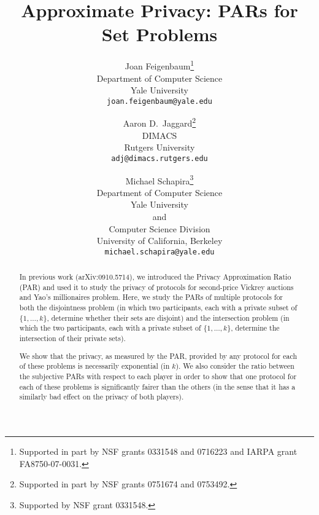 \documentclass{article}
\theoremstyle{theorem}
\theoremstyle{definition}
\theoremstyle{remark}
\begin{document}
\title{Approximate Privacy: PARs for Set Problems}

\author{Joan Feigenbaum\thanks{Supported in part by NSF grants
0331548 and 0716223 and IARPA grant FA8750-07-0031.}\\
Department of Computer Science\\
Yale University\\
\texttt{joan.feigenbaum@yale.edu}
\and
Aaron D.\ Jaggard\thanks{Supported in part by
NSF grants 0751674 and 0753492.}\\
DIMACS\\
Rutgers University\\
\texttt{adj@dimacs.rutgers.edu}
\and Michael Schapira\thanks{Supported by NSF grant 0331548.}\\
Department of Computer Science\\
Yale University\\
and\\
Computer Science Division\\
University of California, Berkeley\\
\texttt{michael.schapira@yale.edu}
}


\date{}

\maketitle

\begin{abstract}
In previous work (arXiv:0910.5714), we introduced the Privacy Approximation Ratio (PAR) and used it to study the privacy of protocols for second-price Vickrey auctions and Yao's millionaires problem.  Here, we study the PARs of multiple protocols for both the disjointness problem (in which two participants, each with a private subset of $\{1,\ldots,k\}$, determine whether their sets are disjoint) and the intersection problem (in which the two participants, each with a private subset of $\{1,\ldots,k\}$, determine the intersection of their private sets).

We show that the privacy, as measured by the PAR, provided by any protocol for each of these problems is necessarily exponential (in $k$).  We also consider the ratio between the subjective PARs with respect to each player in order to show that one protocol for each of these problems is significantly fairer than the others (in the sense that it has a similarly bad effect on the privacy of both players).
\end{abstract}
\end{document}
